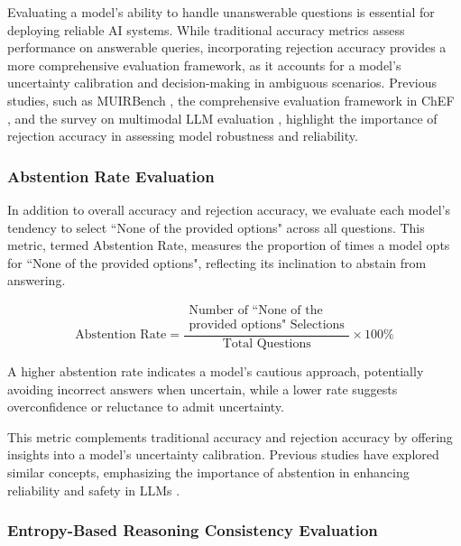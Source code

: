 Evaluating a model's ability to handle unanswerable questions is essential for deploying reliable AI systems. While traditional accuracy metrics assess performance on answerable queries, incorporating rejection accuracy provides a more comprehensive evaluation framework, as it accounts for a model's uncertainty calibration and decision-making in ambiguous scenarios. Previous studies, such as MUIRBench \cite{wang2024muirbench}, the comprehensive evaluation framework in ChEF \cite{ChEF2023}, and the survey on multimodal LLM evaluation \cite{EvaluationSurvey2023}, highlight the importance of rejection accuracy in assessing model robustness and reliability.

\subsubsection{Abstention Rate Evaluation}

In addition to overall accuracy and rejection accuracy, we evaluate each model's tendency to select ``None of the provided options" across all questions. This metric, termed Abstention Rate, measures the proportion of times a model opts for ``None of the provided options", reflecting its inclination to abstain from answering.

\begin{equation}
\text{Abstention Rate} = 
\frac{
    \begin{array}{c}
    \text{Number of ``None of the} \\
    \text{provided options" Selections}
    \end{array}
}{
    \text{Total Questions}
} \times 100\%
\end{equation}


A higher abstention rate indicates a model's cautious approach, potentially avoiding incorrect answers when uncertain, while a lower rate suggests overconfidence or reluctance to admit uncertainty.

This metric complements traditional accuracy and rejection accuracy by offering insights into a model's uncertainty calibration. Previous studies have explored similar concepts, emphasizing the importance of abstention in enhancing reliability and safety in LLMs \cite{wen2024abstention, madhusudhan2024abstention}.



\subsubsection{Entropy-Based Reasoning Consistency Evaluation} 

